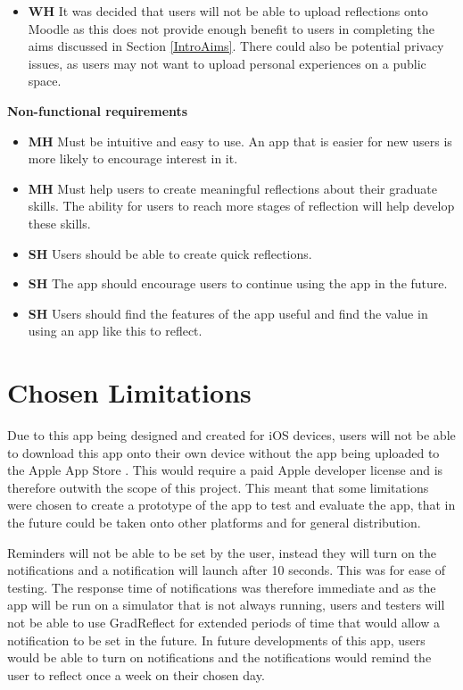\documentclass{l4proj}
\begin{document}
\begin{itemize}
    \item \textbf{WH} It was decided that users will not be able to upload reflections onto Moodle as this does not provide enough benefit to users in completing the aims discussed in Section \ref{IntroAims}. There could also be potential privacy issues, as users may not want to upload personal experiences on a public space.
\end{itemize}

\textbf{Non-functional requirements}
\begin{itemize}
    \item \textbf{MH} Must be intuitive and easy to use. An app that is easier for new users is more likely to encourage interest in it.
    \item \textbf{MH} Must help users to create meaningful reflections about their graduate skills. The ability for users to reach more stages of reflection will help develop these skills.
    \item \textbf{SH} Users should be able to create quick reflections.
    \item \textbf{SH} The app should encourage users to continue using the app in the future.
    \item \textbf{SH} Users should find the features of the app useful and find the value in using an app like this to reflect. 
\end{itemize}


\section{Chosen Limitations}

Due to this app being designed and created for iOS devices, users will not be able to download this app onto their own device without the app being uploaded to the Apple App Store \citep{apple_inc_app_2021}. This would require a paid Apple developer license and is therefore outwith the scope of this project. This meant that some limitations were chosen to create a prototype of the app to test and evaluate the app, that in the future could be taken onto other platforms and for general distribution.

Reminders will not be able to be set by the user, instead they will turn on the notifications and a notification will launch after 10 seconds. This was for ease of testing. The response time of notifications was therefore immediate and as the app will be run on a simulator that is not always running, users and testers will not be able to use GradReflect for extended periods of time that would allow a notification to be set in the future. In future developments of this app, users would be able to turn on notifications and the notifications would remind the user to reflect once a week on their chosen day. 
\end{document}
